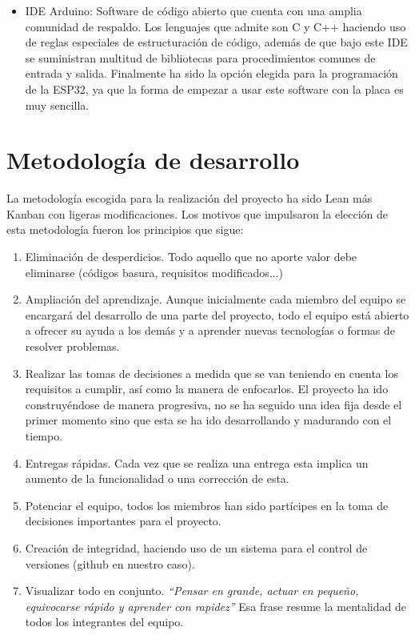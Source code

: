 \documentclass[runningheads]{llncs}
\begin{document}
\begin{itemize}
    \item IDE Arduino:  Software de código abierto que cuenta con una amplia comunidad de respaldo. Los lenguajes que admite son C y C++ haciendo uso de reglas especiales de estructuración de código, además de que bajo este IDE se suministran multitud de bibliotecas para procedimientos comunes de entrada y salida. Finalmente ha sido la opción elegida para la programación de la ESP32, ya que la forma de empezar a usar este software con la placa es muy sencilla.
    
\end{itemize}

\section{Metodología de desarrollo}
La metodología escogida para la realización del proyecto ha sido Lean más Kanban con ligeras modificaciones. Los motivos que impulsaron la elección de esta metodología fueron los principios que sigue:

\begin{enumerate}
\item Eliminación de desperdicios. Todo aquello que no aporte valor debe eliminarse (códigos basura, requisitos modificados...)
\item Ampliación del aprendizaje. Aunque inicialmente cada miembro del equipo se encargará del desarrollo de una parte del proyecto, todo el equipo está abierto a ofrecer su ayuda a los demás y a aprender nuevas tecnologías o formas de resolver problemas.
\item Realizar las tomas de decisiones a medida que se van teniendo en cuenta los requisitos a cumplir, así como la manera de enfocarlos. El proyecto ha ido construyéndose de manera progresiva, no se ha seguido una idea fija desde el primer momento sino que esta se ha ido desarrollando y madurando con el tiempo.
\item Entregas rápidas. Cada vez que se realiza una entrega esta implica un aumento de la funcionalidad o una corrección de esta.
\item Potenciar el equipo, todos los miembros han sido partícipes en la toma de decisiones importantes para el proyecto.
\item Creación de integridad, haciendo uso de un sistema para el control de versiones (github en nuestro caso).
\item Visualizar todo en conjunto. \textit{“Pensar en grande, actuar en pequeño, equivocarse rápido y aprender con rapidez”} Esa frase resume la mentalidad de todos los integrantes del equipo.
\end{enumerate}
\end{document}
